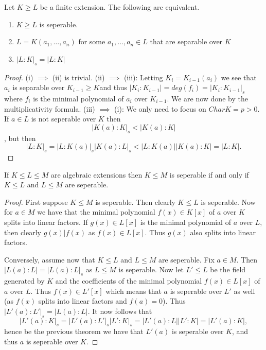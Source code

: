 \documentclass[twoside, a4paper, 10pt]{amsart}
\begin{document}
\begin{thm}\label{thm: characterise seperable} Let $K \geq L$ be a finite extension. The following are equivalent.

\begin{enumerate}
	\item $K \geq L$ is seperable.
	\item $L = K(a_1, \ldots, a_n)$ for some $a_1, \ldots, a_n \in L$ that are separable over $K$
	\item $|L:K|_s = |L:K|$
\end{enumerate}

\end{thm}

\begin{proof} (i) $\implies$ (ii) is trivial. (ii) $\implies$ (iii): Letting $K_i = K_{i-1}(a_i)$ we see that $a_i$ is separable over $K_{i-1} \geq K$and thus $|K_{i}:K_{i-1}| = deg(f_i) = |K_i:K_{i-1}|_s$ where $f_i$ is the minimal polynomial of $a_i$ over $K_{i-1}$. We are now done by the multiplicativity formula. (iii) $\implies$ (i): We only need to focus on $Char K = p >0$. If $a \in L$ is not seperable over $K$ then $$|K(a):K|_s < |K(a):K|$$, but then $$|L:K|_s = |L:K(a)|_s |K(a):L|_s < |L:K(a)||K(a):K| = |L:K|.$$ 

\end{proof}

\begin{corol} If $K \leq L \leq M$ are algebraic extensions then $K \leq M$ is seperable if and only if $K \leq L$ and $L \leq M$ are seperable.

\end{corol}

\begin{proof} First suppose $K \leq M$ is seperable. Then clearly $K \leq L$ is seperable. Now for $a \in M$ we have that the minimal polynomial $f(x) \in K[x]$ of $a$ over $K$ splits into linear factors. If $g(x) \in L[x]$ is the minimal polynomial of $a$ over $L$, then clearly $g(x) | f(x)$ as $f(x) \in L[x]$. Thus $g(x)$ also splits into linear factors.

Conversely, assume now that $K \leq L$ and $L \leq M$ are seperable. Fix $a \in M$. Then $|L(a):L| = |L(a):L|_s$ as $L \leq M$ is seperable. Now let $L' \leq L$ be the field generated by $K$ and the coefficients of the minimal polynomial $f(x) \in L[x]$ of $a$ over $L$. Thus $f(x) \in L'[x]$ which means that $a$ is seperable over $L'$ as well (as $f(x)$ splits into linear factors and $f(a) = 0$). Thus $|L'(a):L'|_s = |L(a):L|$. It now follows that $$|L'(a):K|_s = |L'(a):L'|_s |L':K|_s = |L'(a):L||L':K| = |L'(a):K|,$$ hence be the previous theorem we have that $L'(a)$ is seperable over $K$, and thus $a$ is seperable over $K$. \end{proof}
\end{document}
